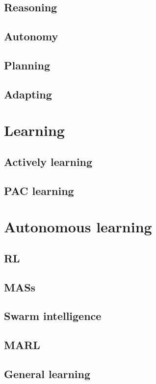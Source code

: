 \subsection{Reasoning}\label{subsec:reasoning}

\subsection{Autonomy}\label{subsec:autonomy}

\subsection{Planning}\label{subsec:planning}

\subsection{Adapting}\label{subsec:adapting}

\section{Learning}\label{sec:learning}

\subsection{Actively learning}\label{subsec:actively-learning}

\subsection{\Acl{PAC} learning}\label{subsec:pac-learning}

\section{Autonomous learning}\label{sec:autonomous-learning}

\subsection{\Acl{RL}}\label{subsec:rl}

\subsection{\Aclp{MAS}}\label{subsec:mas}

\subsection{Swarm intelligence}\label{subsec:swarm-intelligence}

\subsection{\Acl{MARL}}\label{subsec:marl}

\subsection{General learning}\label{subsec:general-learning}
